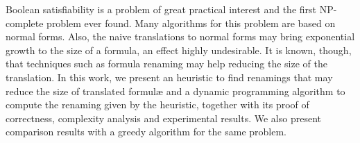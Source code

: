 Boolean satisfiability is a problem of great practical interest and the first NP-complete problem ever found. Many algorithms for this problem are based on normal forms. Also, the naive translations to normal forms may bring exponential growth to the size of a formula, an effect highly undesirable. It is known, though, that techniques such as formula renaming may help reducing the size of the translation. In this work, we present an heuristic to find renamings that may reduce the size of translated formul\ae \; and a dynamic programming algorithm to compute the renaming given by the heuristic, together with its proof of correctness, complexity analysis and experimental results. We also present comparison results with a greedy algorithm for the same problem.